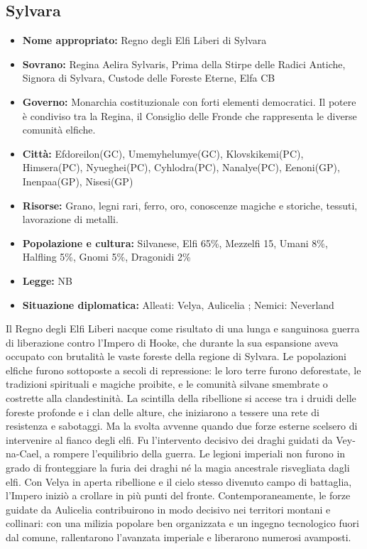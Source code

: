 \documentclass[10pt, a4paper]{report}
\begin{document}
\begin{multicols}{2}
\subsection*{Sylvara}
\begin{itemize}
	\item \textbf{Nome appropriato:} Regno degli Elfi Liberi di Sylvara
	\item \textbf{Sovrano:} Regina Aelira Sylvaris, Prima della Stirpe delle Radici Antiche, Signora di Sylvara, Custode delle Foreste Eterne, Elfa CB
	\item \textbf{Governo:} Monarchia costituzionale con forti elementi democratici. Il potere è condiviso tra la Regina, il Consiglio delle Fronde che rappresenta le diverse comunità elfiche.
	\item \textbf{Città:} Efdoreilon(GC), Umemyhelumye(GC), Klovskikemi(PC), Himsera(PC), Nyueghei(PC), Cyhlodra(PC), Nanalye(PC), Eenoni(GP), Inenpaa(GP), Nisesi(GP)
	\item \textbf{Risorse:} Grano, legni rari, ferro, oro, conoscenze magiche e storiche, tessuti, lavorazione di metalli.
	\item \textbf{Popolazione e cultura:} Silvanese, Elfi 65\%, Mezzelfi 15, Umani 8\%, Halfling 5\%, Gnomi 5\%, Dragonidi 2\%
	\item \textbf{Legge:} NB
	\item \textbf{Situazione diplomatica:} Alleati: Velya, Aulicelia ; Nemici: Neverland
\end{itemize}
Il Regno degli Elfi Liberi nacque come risultato di una lunga e sanguinosa guerra di liberazione contro l’Impero di Hooke, che durante la sua espansione aveva occupato con brutalità le vaste foreste della regione di Sylvara. Le popolazioni elfiche furono sottoposte a secoli di repressione: le loro terre furono deforestate, le tradizioni spirituali e magiche proibite, e le comunità silvane smembrate o costrette alla clandestinità.
La scintilla della ribellione si accese tra i druidi delle foreste profonde e i clan delle alture, che iniziarono a tessere una rete di resistenza e sabotaggi. Ma la svolta avvenne quando due forze esterne scelsero di intervenire al fianco degli elfi.
Fu l’intervento decisivo dei draghi guidati da Vey-na-Cael, a rompere l’equilibrio della guerra. Le legioni imperiali non furono in grado di fronteggiare la furia dei draghi né la magia ancestrale risvegliata dagli elfi. Con Velya in aperta ribellione e il cielo stesso divenuto campo di battaglia, l’Impero iniziò a crollare in più punti del fronte.
Contemporaneamente, le forze guidate da Aulicelia contribuirono in modo decisivo nei territori montani e collinari: con una milizia popolare ben organizzata e un ingegno tecnologico fuori dal comune, rallentarono l’avanzata imperiale e liberarono numerosi avamposti.

\end{multicols}
\end{document}
